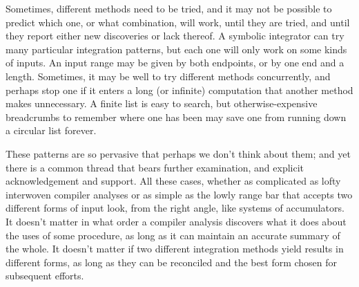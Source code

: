 \documentclass[12pt]{article}
\begin{document}
Sometimes, different methods need to be tried, and it may not be
possible to predict which one, or what combination, will work, until
they are tried, and until they report either new discoveries or lack
thereof.  A symbolic integrator can try many particular integration
patterns, but each one will only work on some kinds of inputs.  An
input range may be given by both endpoints, or by one end and a
length.  Sometimes, it may be well to try different methods
concurrently, and perhaps stop one if it enters a long (or infinite)
computation that another method makes unnecessary.  A finite list is easy
to search, but otherwise-expensive breadcrumbs to remember where one
has been may save one from running down a circular list forever.

These patterns are so pervasive that perhaps we don't think about
them; and yet there is a common thread that bears further examination,
and explicit acknowledgement and support.  All these cases, whether as
complicated as lofty interwoven compiler analyses or as simple as the
lowly range bar that accepts two different forms of input look, from
the right angle, like systems of accumulators.  It doesn't matter in
what order a compiler analysis discovers what it does about the uses
of some procedure, as long as it can maintain an accurate summary of
the whole.  It doesn't matter if two different integration methods
yield results in different forms, as long as they can be reconciled
and the best form chosen for subsequent efforts.
\end{document}
